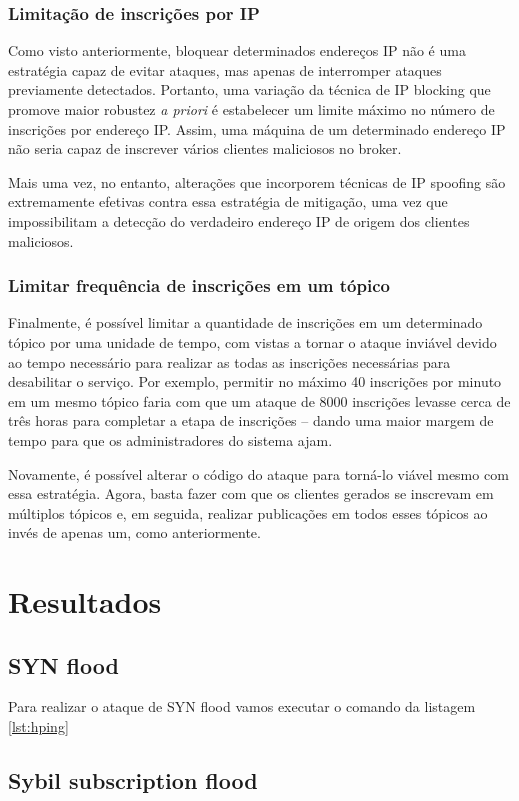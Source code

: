 \subsubsection{Limitação de inscrições por IP}

Como visto anteriormente, bloquear determinados endereços IP não é uma estratégia capaz de evitar ataques, mas apenas de interromper ataques previamente detectados. Portanto, uma variação da técnica de IP blocking que promove maior robustez \emph{a priori} é estabelecer um limite máximo no número de inscrições por endereço IP. Assim, uma máquina de um determinado endereço IP não seria capaz de inscrever vários clientes maliciosos no broker.

Mais uma vez, no entanto, alterações que incorporem técnicas de IP spoofing são extremamente efetivas contra essa estratégia de mitigação, uma vez que impossibilitam a detecção do verdadeiro endereço IP de origem dos clientes maliciosos.



\subsubsection{Limitar frequência de inscrições em um tópico}

Finalmente, é possível limitar a quantidade de inscrições em um determinado tópico por uma unidade de tempo, com vistas a tornar o ataque inviável devido ao tempo necessário para realizar as todas as inscrições necessárias para desabilitar o serviço. Por exemplo, permitir no máximo 40 inscrições por minuto em um mesmo tópico faria com que um ataque  de 8000 inscrições levasse cerca de três horas para completar a etapa de inscrições -- dando uma maior margem de tempo para que os administradores do sistema ajam.

Novamente, é possível alterar o código do ataque para torná-lo viável mesmo com essa estratégia. Agora, basta fazer com que os clientes gerados se inscrevam em múltiplos tópicos e, em seguida, realizar publicações em todos esses tópicos ao invés de apenas um, como anteriormente.




\section{Resultados}

\subsection{SYN flood}

Para realizar o ataque de SYN flood vamos executar o comando da listagem \ref{lst:hping}




\subsection{Sybil subscription flood}









